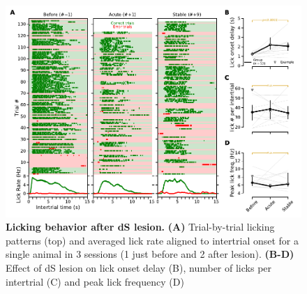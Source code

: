 \begin{figure}[bth!]
  \begin{center}
    \includegraphics[width=1\linewidth]{ch-lesion/figures/Lick.pdf}
    \caption
    {\textbf{Licking behavior after dS lesion.}
	\textbf{(A)} Trial-by-trial licking patterns (top) and averaged lick rate aligned to intertrial onset for a single animal in 3 sessions (1 just before and 2 after lesion). 
	\textbf{(B-D)} Effect of dS lesion on lick onset delay (B), number of licks per intertrial (C) and peak lick frequency (D)
	}
	\label{fig:lesion:lick}
  \end{center}
\end{figure}